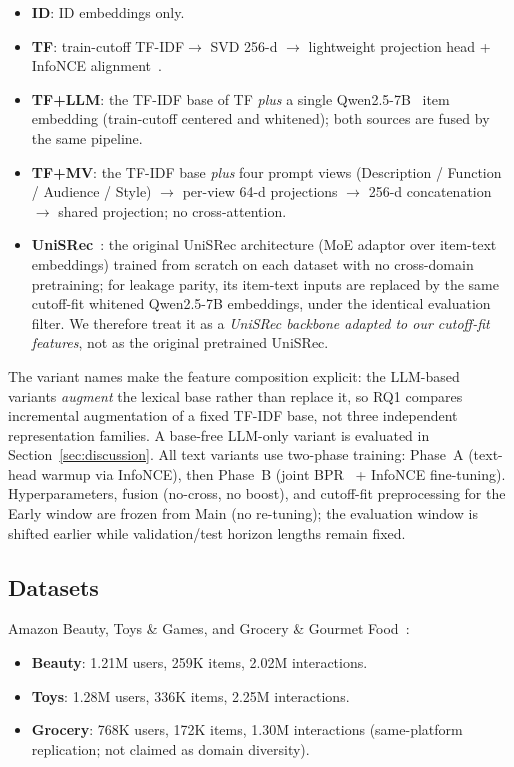 \documentclass[sigconf,natbib=true,anonymous]{acmart}
\newcommand{\tfidf}{\textsc{TF-IDF}\xspace}
\newcommand{\tfllm}{\textsc{TF+LLM}\xspace}
\newcommand{\tfmv}{\textsc{TF+MV}\xspace}
\begin{document}
\begin{itemize}[leftmargin=*,itemsep=1pt]
\item \textbf{ID}: ID embeddings only.
\item \textbf{TF}: train-cutoff \tfidf $\to$ SVD 256-d $\to$ lightweight projection head + InfoNCE alignment~\cite{oord2018cpc}.
\item \textbf{\tfllm}: the \tfidf base of TF \emph{plus} a single Qwen2.5-7B~\cite{qwen2024qwen25} item embedding (train-cutoff centered and whitened); both sources are fused by the same pipeline.
\item \textbf{\tfmv}: the \tfidf base \emph{plus} four prompt views (Description / Function / Audience / Style) $\to$ per-view 64-d projections $\to$ 256-d concatenation $\to$ shared projection; no cross-attention.
\item \textbf{UniSRec}~\cite{hou2022unisrec}: the original UniSRec architecture (MoE adaptor over item-text embeddings) trained from scratch on each dataset with no cross-domain pretraining; for leakage parity, its item-text inputs are replaced by the same cutoff-fit whitened Qwen2.5-7B embeddings, under the identical evaluation filter.  We therefore treat it as a \emph{UniSRec backbone adapted to our cutoff-fit features}, not as the original pretrained UniSRec.
\end{itemize}

The variant names make the feature composition explicit: the LLM-based variants \emph{augment} the lexical base rather than replace it, so RQ1 compares incremental augmentation of a fixed \tfidf base, not three independent representation families.
A base-free LLM-only variant is evaluated in Section~\ref{sec:discussion}.
All text variants use two-phase training: Phase~A (text-head warmup via InfoNCE), then Phase~B (joint BPR~\cite{rendle2009bpr} + InfoNCE fine-tuning).
Hyperparameters, fusion (no-cross, no boost), and cutoff-fit preprocessing for the Early window are frozen from Main (no re-tuning); the evaluation window is shifted earlier while validation/test horizon lengths remain fixed.

\subsection{Datasets}

Amazon Beauty, Toys \& Games, and Grocery \& Gourmet Food~\cite{mcauley2015amazon,ni2019amazon}:
\begin{itemize}[leftmargin=*,itemsep=1pt]
\item \textbf{Beauty}: 1.21M users, 259K items, 2.02M interactions.
\item \textbf{Toys}: 1.28M users, 336K items, 2.25M interactions.
\item \textbf{Grocery}: 768K users, 172K items, 1.30M interactions (same-platform replication; not claimed as domain diversity).
\end{itemize}
\end{document}
